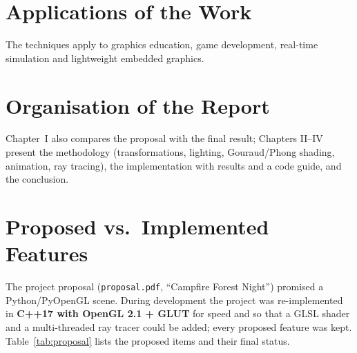 \documentclass[12pt,a4paper]{report}
\begin{document}
\section{Applications of the Work}

The techniques apply to graphics education, game development, real-time simulation and lightweight embedded graphics.

\section{Organisation of the Report}

Chapter~I also compares the proposal with the final result; Chapters II--IV present the methodology (transformations, lighting, Gouraud/Phong shading, animation, ray tracing), the implementation with results and a code guide, and the conclusion.

\section{Proposed vs.\ Implemented Features}

The project proposal (\texttt{proposal.pdf}, ``Campfire Forest Night'') promised a Python/PyOpenGL scene. During development the project was re-implemented in \textbf{C++17 with OpenGL 2.1 + GLUT} for speed and so that a GLSL shader and a multi-threaded ray tracer could be added; every proposed feature was kept. Table~\ref{tab:proposal} lists the proposed items and their final status.
\end{document}
